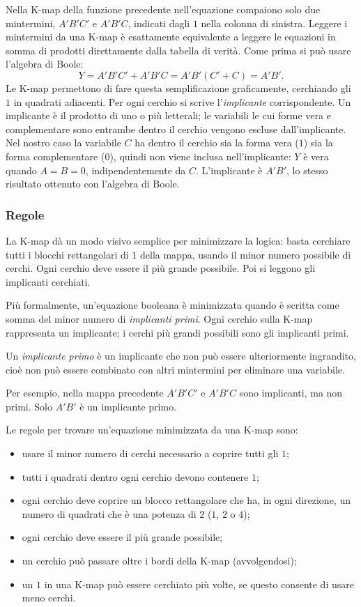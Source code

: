 \documentclass[11pt,a4paper]{article}
\begin{document}
Nella K-map della funzione precedente nell'equazione compaiono solo due mintermini, $A'B'C'$ e $A'B'C$, indicati dagli $1$ nella colonna di sinistra. Leggere i mintermini da una K-map è esattamente equivalente a leggere le equazioni in somma di prodotti direttamente dalla tabella di verità. Come prima si può usare l'algebra di Boole:
\[
Y = A'B'C' + A'B'C = A'B'(C' + C) = A'B'.
\]
Le K-map permettono di fare questa semplificazione graficamente, cerchiando gli $1$ in quadrati adiacenti. Per ogni cerchio si scrive l'\emph{implicante} corrispondente. Un implicante è il prodotto di uno o più letterali; le variabili le cui forme vera e complementare sono entrambe dentro il cerchio vengono escluse dall'implicante. Nel nostro caso la variabile $C$ ha dentro il cerchio sia la forma vera ($1$) sia la forma complementare ($0$), quindi non viene inclusa nell'implicante: $Y$ è vera quando $A = B = 0$, indipendentemente da $C$. L'implicante è $A'B'$, lo stesso risultato ottenuto con l'algebra di Boole.

\subsubsection{Regole}

La K-map dà un modo visivo semplice per minimizzare la logica: basta cerchiare tutti i blocchi rettangolari di $1$ della mappa, usando il minor numero possibile di cerchi. Ogni cerchio deve essere il più grande possibile. Poi si leggono gli implicanti cerchiati.

Più formalmente, un'equazione booleana è minimizzata quando è scritta come somma del minor numero di \emph{implicanti primi}. Ogni cerchio sulla K-map rappresenta un implicante; i cerchi più grandi possibili sono gli implicanti primi.

\begin{definizione}
Un \emph{implicante primo} è un implicante che non può essere ulteriormente ingrandito, cioè non può essere combinato con altri mintermini per eliminare una variabile.
\end{definizione}

Per esempio, nella mappa precedente $A'B'C'$ e $A'B'C$ sono implicanti, ma non primi. Solo $A'B'$ è un implicante primo.

Le regole per trovare un'equazione minimizzata da una K-map sono:
\begin{itemize}
    \item usare il minor numero di cerchi necessario a coprire tutti gli $1$;
    \item tutti i quadrati dentro ogni cerchio devono contenere $1$;
    \item ogni cerchio deve coprire un blocco rettangolare che ha, in ogni direzione, un numero di quadrati che è una potenza di $2$ ($1$, $2$ o $4$);
    \item ogni cerchio deve essere il più grande possibile;
    \item un cerchio può passare oltre i bordi della K-map (avvolgendosi);
    \item un $1$ in una K-map può essere cerchiato più volte, se questo consente di usare meno cerchi.
\end{itemize}
\end{document}
